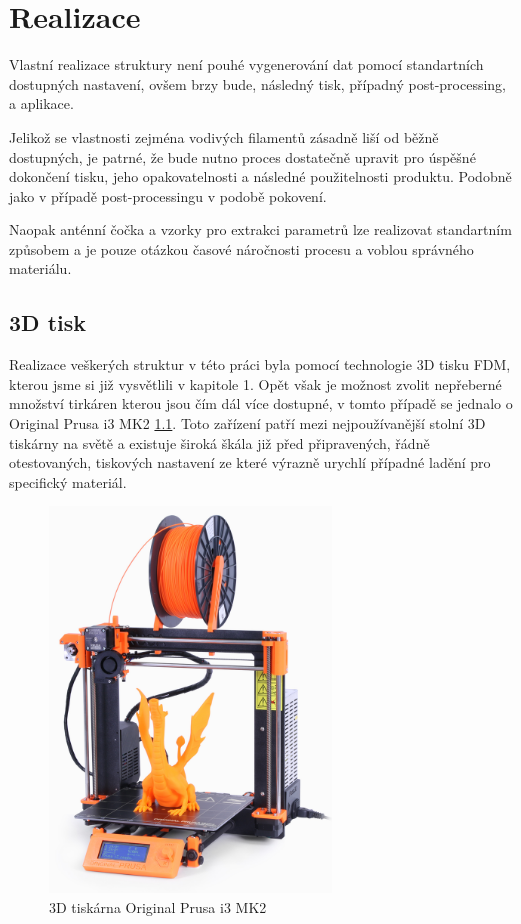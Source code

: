 \chapter{Realizace}

Vlastní realizace struktury není pouhé vygenerování dat pomocí standartních dostupných nastavení, ovšem brzy bude, následný tisk, případný post-processing, a aplikace.

Jelikož se vlastnosti zejména vodivých filamentů zásadně liší od běžně dostupných, je patrné, že bude nutno proces dostatečně upravit pro úspěšné dokončení tisku, jeho opakovatelnosti a následné použitelnosti produktu. Podobně jako v případě post-processingu v podobě pokovení.

Naopak anténní čočka a vzorky pro extrakci parametrů lze realizovat standartním způsobem a je pouze otázkou časové náročnosti procesu a voblou správného materiálu.

\section{3D tisk}
Realizace veškerých struktur v této práci byla pomocí technologie 3D tisku FDM, kterou jsme si již vysvětlili v kapitole 1. Opět však je možnost zvolit nepřeberné množství tirkáren kterou jsou čím dál více dostupné, v tomto případě se jednalo o Original Prusa i3 MK2 \ref{fig:PrinterMK2}. Toto zařízení patří mezi nejpoužívanější stolní 3D tiskárny na světě \cite{3Dhubs} a existuje široká škála již před připravených, řádně otestovaných, tiskových nastavení ze které výrazně urychlí případné ladění pro specifický materiál.

\begin{figure}[h]
\begin{center}
\includegraphics[width=7.5cm]{pics/Printer}
\caption{3D tiskárna Original Prusa i3 MK2}
\label{fig:PrinterMK2}
\end{center}
\end{figure}

